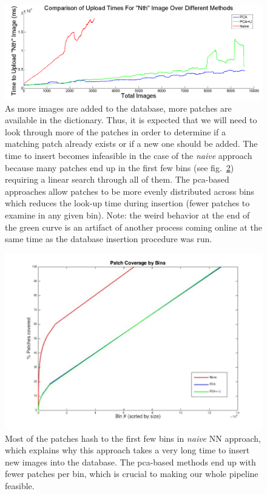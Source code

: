  \begin{figure}
\hspace{-10mm}
\includegraphics[width=1\linewidth]{Figures/upload_times.png}
\caption{As more images are added to the database, more patches are available in the dictionary. Thus, it is expected that we will need to look through more of the patches in order to determine if a matching patch already exists or if a new one should be added. The time to insert becomes infeasible in the case of the \emph{naive} approach because many patches end up in the first few bins (see fig.~\ref{fig:bin_cover}) requiring a linear search through all of them. The pca-based approaches allow patches to be more evenly distributed across bins which reduces the look-up time during insertion (fewer patches to examine in any given bin). Note: the weird behavior at the end of the green curve is an artifact of another process coming online at the same time as the database insertion procedure was run.}
\label{fig:upload_times}
\end{figure}

 \begin{figure}
\includegraphics[width=1\linewidth]{fig_NN/bin_cover.jpg}
\caption{Most of the patches hash to the first few bins in \emph{naive} NN approach, which explains why this approach takes a very long time to insert new images into the database. The pca-based methods end up with fewer patches per bin, which is crucial to making our whole pipeline feasible.}
\label{fig:bin_cover}
\end{figure}

